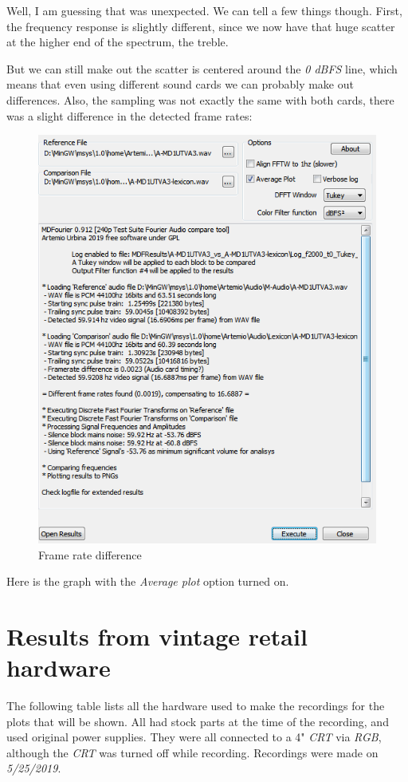 \documentclass[10pt,a4paper]{report}
\begin{document}
Well, I am guessing that was unexpected. We can tell a few things though. First, the frequency response is slightly different, since we now have that huge scatter at the higher end of the spectrum, the treble.

But we can still make out the scatter is centered around the \textit{0 dBFS} line, which means that even using different sound cards we can probably make out differences. Also, the sampling was not exactly the same with both cards, there was a slight difference in the detected frame rates:

\begin{figure}[H]
	\centering
	\includegraphics[width=0.6\linewidth]{plots/Plot5-1-FramerateDiff.png}
	\caption[Front End]{Frame rate difference}
	\label{fig:plot5-1-frameratediff}
\end{figure}

Here is the graph with the \textit{Average plot} option turned on.



\chapter{Results from vintage retail hardware}

The following table lists all the hardware used to make the recordings for the plots that will be shown. All had stock parts at the time of the recording, and used original power supplies. They were all connected to a 4" \textit{CRT} via \textit{RGB}, although the \textit{CRT} was turned off while recording. Recordings were made on \textit{5/25/2019}.
\end{document}
